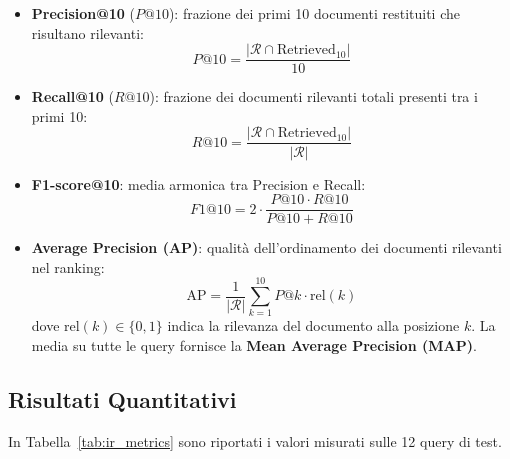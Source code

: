 \documentclass[11pt,a4paper]{article}
\begin{document}
\begin{itemize}
    \item \textbf{Precision@10} ($P@10$): frazione dei primi 10 documenti restituiti che risultano rilevanti:
    \begin{equation}
        P@10 = \frac{|\mathcal{R} \cap \text{Retrieved}_{10}|}{10}
    \end{equation}
    \item \textbf{Recall@10} ($R@10$): frazione dei documenti rilevanti totali presenti tra i primi 10:
    \begin{equation}
        R@10 = \frac{|\mathcal{R} \cap \text{Retrieved}_{10}|}{|\mathcal{R}|}
    \end{equation}
    \item \textbf{F1-score@10}: media armonica tra Precision e Recall:
    \begin{equation}
        F1@10 = 2 \cdot \frac{P@10 \cdot R@10}{P@10 + R@10}
    \end{equation}
    \item \textbf{Average Precision (AP)}: qualità dell'ordinamento dei documenti rilevanti nel ranking:
    \begin{equation}
        \text{AP} = \frac{1}{|\mathcal{R}|} \sum_{k=1}^{10} P@k \cdot \text{rel}(k)
    \end{equation}
    dove $\text{rel}(k) \in \{0, 1\}$ indica la rilevanza del documento alla posizione $k$. La media su tutte le query fornisce la \textbf{Mean Average Precision (MAP)}.
\end{itemize}

\subsection{Risultati Quantitativi}
In Tabella~\ref{tab:ir_metrics} sono riportati i valori misurati sulle 12 query di test.
\end{document}
